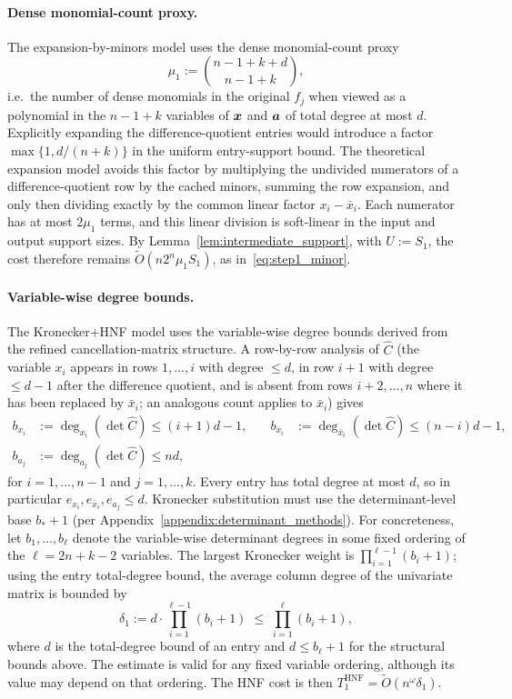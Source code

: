 \paragraph{Dense monomial-count proxy.}
The expansion-by-minors model uses the dense monomial-count proxy
\[
\mu_1 := \binom{n-1+k+d}{n-1+k},
\]
i.e.\ the number of dense monomials in the original $f_j$ when viewed as a polynomial in the $n-1+k$ variables of ${\boldsymbol{x}}$ and ${\boldsymbol{a}}$ of total degree at most $d$. Explicitly expanding the difference-quotient entries would introduce a factor $\max\{1,d/(n+k)\}$ in the uniform entry-support bound. The theoretical expansion model avoids this factor by multiplying the undivided numerators of a difference-quotient row by the cached minors, summing the row expansion, and only then dividing exactly by the common linear factor $x_i-\bar{x}_i$. Each numerator has at most $2\mu_1$ terms, and this linear division is soft-linear in the input and output support sizes. By Lemma~\ref{lem:intermediate_support}, with $U:=S_1$, the cost therefore remains $\widetilde{O}(n2^n\mu_1S_1)$, as in~\eqref{eq:step1_minor}.

\paragraph{Variable-wise degree bounds.}
The Kronecker$+$HNF model uses the variable-wise degree bounds derived from the refined cancellation-matrix structure. A row-by-row analysis of $\widehat{C}$ (the variable $x_i$ appears in rows $1,\ldots,i$ with degree $\leq d$, in row $i+1$ with degree $\leq d-1$ after the difference quotient, and is absent from rows $i+2,\ldots,n$ where it has been replaced by $\bar{x}_i$; an analogous count applies to $\bar{x}_i$) gives
\[
\begin{aligned}
	b_{x_i} &:= \deg_{x_i}(\det\widehat{C})\le (i+1)d-1, &\quad
	b_{\bar{x}_i} &:= \deg_{\bar{x}_i}(\det\widehat{C})\le (n-i)d-1,\\
	b_{a_j} &:= \deg_{a_j}(\det\widehat{C})\le nd, &&
\end{aligned}
\]
for $i=1,\ldots,n-1$ and $j=1,\ldots,k$. Every entry has total degree at most $d$, so in particular $e_{x_i}, e_{\bar x_i}, e_{a_j}\le d$. Kronecker substitution must use the determinant-level base $b_*+1$ (per Appendix~\ref{appendix:determinant_methods}). For concreteness, let $b_1,\ldots,b_\ell$ denote the variable-wise determinant degrees in some fixed ordering of the $\ell=2n+k-2$ variables. The largest Kronecker weight is $\prod_{i=1}^{\ell-1}(b_i+1)$; using the entry total-degree bound, the average column degree of the univariate matrix is bounded by
\[
\delta_1 := d\cdot\prod_{i=1}^{\ell-1}(b_i+1)\;\le\;\prod_{i=1}^{\ell}(b_i+1),
\]
where $d$ is the total-degree bound of an entry and $d\le b_\ell+1$ for the structural bounds above. The estimate is valid for any fixed variable ordering, although its value may depend on that ordering. The HNF cost is then $T_{1}^{\mathrm{HNF}}=\widetilde{O}(n^\omega \delta_1)$.

